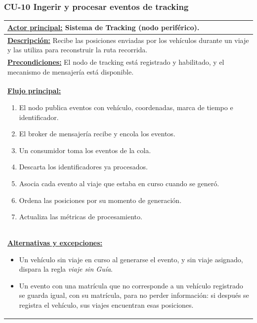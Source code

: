 \subsubsection{CU-10 Ingerir y procesar eventos de tracking}\label{sec:cu-10}
\begin{table}[H]
\small
\setlength{\tabcolsep}{8pt}
\renewcommand{\arraystretch}{1.1}
\centering
\begin{tabular}{|p{15.8cm}|}
\hline
\textbf{\underline{Actor principal:}} Sistema de Tracking (nodo periférico). \\ \hline
\textbf{\underline{Descripción:}} Recibe las posiciones enviadas por los vehículos durante un viaje y las utiliza para reconstruir la ruta recorrida. \\ \hline
\textbf{\underline{Precondiciones:}} El nodo de tracking está registrado y habilitado, y el mecanismo de mensajería está disponible. \\ \hline
\textbf{\underline{Flujo principal:}}\par
\begin{enumerate}[leftmargin=*,topsep=2pt,itemsep=1pt,parsep=0pt,partopsep=0pt]
    \item El nodo publica eventos con vehículo, coordenadas, marca de tiempo e identificador.
    \item El broker de mensajería recibe y encola los eventos.
    \item Un consumidor toma los eventos de la cola.
    \item Descarta los identificadores ya procesados.
    \item Asocia cada evento al viaje que estaba en curso cuando se generó.
    \item Ordena las posiciones por su momento de generación.
    \item Actualiza las métricas de procesamiento.
\end{enumerate} \\ \hline
\textbf{\underline{Alternativas y excepciones:}}\par
\begin{itemize}[leftmargin=*,topsep=2pt,itemsep=1pt,parsep=0pt,partopsep=0pt]
    \item Un vehículo sin viaje en curso al generarse el evento, y sin viaje asignado, dispara la regla \emph{viaje sin Guía}.
    \item Un evento con una matrícula que no corresponde a un vehículo registrado se guarda igual, con su matrícula, para no perder información: si después se registra el vehículo, sus viajes encuentran esas posiciones.

\end{itemize}
\end{tabular}
\end{table}
